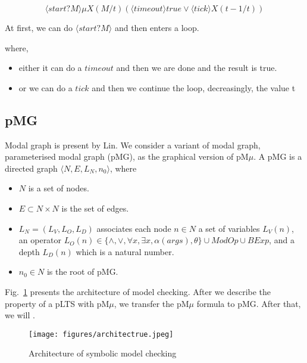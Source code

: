 \documentclass[runningheads,a4paper]{llncs}
\begin{document}
\begin{equation}\label{formula1}
	\langle start?M\rangle\mu X(M/t)(\langle timeout\rangle true \vee \langle tick\rangle X(t-1/t))
\end{equation}

At first, we can do $\langle start?M\rangle$ and then enters a loop.

where, 
\begin{itemize}
\item either it can do a $timeout$ and then we are done and the result is true.
\item or we can do a $tick$ and then we continue the loop, decreasingly, the value t 
\end{itemize}


\subsection{pMG}

Modal graph is present by Lin\cite{lin2001modal}. We consider a variant of modal graph, parameterised modal graph (pMG), as the graphical version of pM$\mu$. A pMG is a directed graph $\langle N, E, L_{N}, n_{0}\rangle$, where
\begin{itemize}
	\item $N$ is a set of nodes.
	\item $E \subset N\times N$ is the set of edges.
	\item $L_{N} = (L_{V}, L_{O}, L_{D})$ associates each node $n\in N$ a set of variables $L_{V}(n)$, an operator $L_{O}(n)\in\{\wedge, \vee, \forall x, \exists x, \alpha(args), \theta\}\cup ModOp \cup BExp$, and a depth $L_{D}(n)$ which is a natural number.
	\item $n_{0} \in N$ is the root of pMG.
\end{itemize}

Fig.~\ref{architectrue} presents the architecture of model checking. After we describe the property of a pLTS with pM$\mu$, we transfer the pM$\mu$ formula to pMG. After that, we will {\color{red}{verify the pLTS model with the pMG by the algorithm}}. 

{\color{red}{[To do Tengfei: Be more precise]}}


\begin{figure}
    \centering\texttt{[image: figures/architectrue.jpeg]} 
    \caption{Architecture of symbolic model checking}
    \label{architectrue}
\end{figure}
\end{document}
